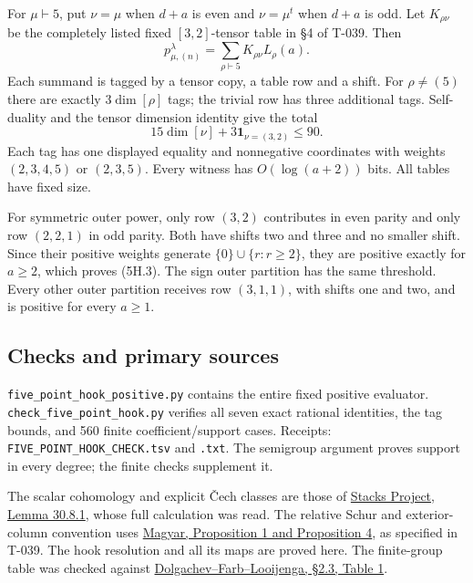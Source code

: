 \documentclass[
  10pt,
]{article}
\begin{document}
For \(\mu\vdash5\), put \(\nu=\mu\) when \(d+a\) is even and
\(\nu=\mu^t\) when \(d+a\) is odd. Let \(K_{\rho\nu}\) be the completely
listed fixed \([3,2]\)-tensor table in §4 of T-039. Then \[
\boxed{p_{\mu,(n)}^\lambda=\sum_{\rho\vdash5}K_{\rho\nu}L_\rho(a).}
\tag{5H.16}
\] Each summand is tagged by a tensor copy, a table row and a shift. For
\(\rho\ne(5)\) there are exactly \(3\dim[\rho]\) tags; the trivial row
has three additional tags. Self-duality and the tensor dimension
identity give the total \[
15\dim[\nu]+3\mathbf1_{\nu=(3,2)}\le90.
\tag{5H.17}
\] Each tag has one displayed equality and nonnegative coordinates with
weights \((2,3,4,5)\) or \((2,3,5)\). Every witness has \(O(\log(a+2))\)
bits. All tables have fixed size.

For symmetric outer power, only row \((3,2)\) contributes in even parity
and only row \((2,2,1)\) in odd parity. Both have shifts two and three
and no smaller shift. Since their positive weights generate
\(\{0\}\cup\{r:r\ge2\}\), they are positive exactly for \(a\ge2\), which
proves (5H.3). The sign outer partition has the same threshold. Every
other outer partition receives row \((3,1,1)\), with shifts one and two,
and is positive for every \(a\ge1\).

\subsection{Checks and primary
sources}\label{checks-and-primary-sources}

\texttt{\small five\_\allowbreak{}point\_\allowbreak{}hook\_\allowbreak{}positive.py}
contains the entire fixed positive evaluator.
\texttt{\small check\_\allowbreak{}five\_\allowbreak{}point\_\allowbreak{}hook.py}
verifies all seven exact rational identities, the tag bounds, and 560
finite coefficient/support cases. Receipts:
\texttt{\small FIVE\_\allowbreak{}POINT\_\allowbreak{}HOOK\_\allowbreak{}CHECK.tsv}
and \texttt{\small .txt}. The semigroup argument proves support in every
degree; the finite checks supplement it.

The scalar cohomology and explicit Čech classes are those of
\href{https://stacks.math.columbia.edu/tag/01XS}{Stacks Project, Lemma
30.8.1}, whose full calculation was read. The relative Schur and
exterior-column convention uses
\href{https://arxiv.org/pdf/alg-geom/9411014}{Magyar, Proposition 1 and
Proposition 4}, as specified in T-039. The hook resolution and all its
maps are proved here. The finite-group table was checked against
\href{https://www.math.uchicago.edu/~farb/papers/wiman.pdf}{Dolgachev--Farb--Looijenga,
§2.3, Table 1}.
\end{document}
